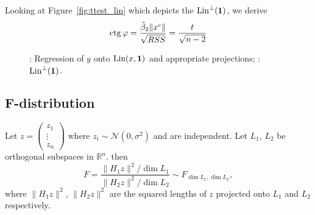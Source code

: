 Looking at Figure~\ref{fig:ttest_lin} which depicts the $\operatorname{Lin}^{\perp}(\mathbf{1})$,
we derive
\[
\operatorname{ctg} \varphi = \frac{\hat \beta_2 \lVert x^c \rVert}{\sqrt{RSS}} = \frac{t}{\sqrt{n-2}}
\]

\begin{figure}[ht!]
\begin{center}
\caption{: Regression of $y$ onto $\operatorname{Lin}(x, \mathbf{1})$ and appropriate projections;
: $\operatorname{Lin}^{\perp}(\mathbf{1})$.}
\end{center}
\end{figure}


\subsection{F-distribution}


\begin{definition}\label{def:f}
Let $z = \begin{pmatrix} z_1 \\ \vdots \\ z_n \end{pmatrix}$
where $z_i \sim \mathcal{N}(0, \sigma^2)$ and are independent.
Let $L_1$, $L_2$ be orthogonal subspaces in $\mathbb{R}^n$.
then
\[
F = \frac{\lVert H_1 z \rVert^2 / \dim L_1}{\lVert H_2 z \rVert^2 / \dim L_2} \sim F_{\dim L_1, \dim L_2},
\]
where $\lVert H_1 z \rVert^2$, $\lVert H_2 z \rVert^2$ are the squared lengths
of $z$ projected onto $L_1$ and $L_2$ respectively.
\end{definition}

